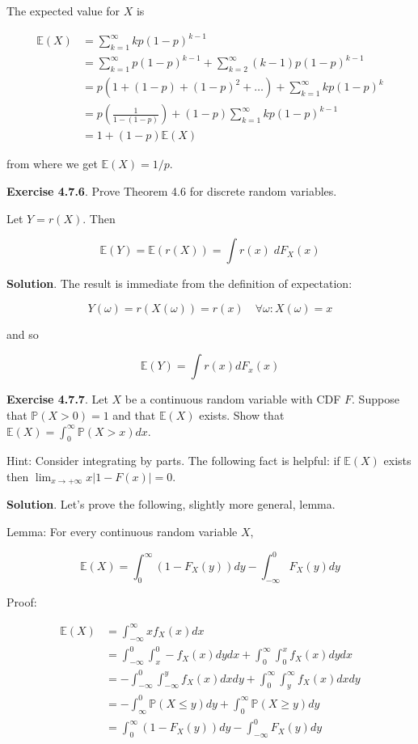 The expected value for \(X\) is

\begin{align}
\mathbb{E}(X) &= \sum_{k=1}^\infty k p (1 - p)^{k - 1}  \\
&= \sum_{k=1}^\infty p(1-p)^{k-1} + \sum_{k=2}^\infty (k - 1) p(1-p)^{k - 1} \\
&= p \left( 1 + (1 - p) + (1 - p)^2 + \dots \right) + \sum_{k=1}^\infty k p(1-p)^k \\
&= p \left(\frac{1}{1 - (1 - p)}\right) + (1 - p) \sum_{k=1}^\infty k p(1-p)^{k - 1} \\
&= 1 + (1 - p) \mathbb{E}(X)
\end{align}

from where we get \(\mathbb{E}(X) = 1 / p\).

\textbf{Exercise 4.7.6}. Prove Theorem 4.6 for discrete random
variables.

Let \(Y = r(X)\). Then

\[ \mathbb{E}(Y) = \mathbb{E}(r(X)) = \int r(x) \; dF_X(x) \]

\textbf{Solution}. The result is immediate from the definition of
expectation:

\[ Y(\omega) = r(X(\omega)) = r(x) \quad \forall \omega : X(\omega) = x \]

and so

\[ \mathbb{E}(Y) = \int r(x) dF_x(x) \]

\textbf{Exercise 4.7.7}. Let \(X\) be a continuous random variable with
CDF \(F\). Suppose that \(\mathbb{P}(X > 0) = 1\) and that
\(\mathbb{E}(X)\) exists. Show that
\(\mathbb{E}(X) = \int_0^\infty \mathbb{P}(X > x) dx\).

Hint: Consider integrating by parts. The following fact is helpful: if
\(\mathbb{E}(X)\) exists then
\(\lim_{x \rightarrow +\infty} x | 1 - F(x) | = 0\).

\textbf{Solution}. Let's prove the following, slightly more general,
lemma.

Lemma: For every continuous random variable \(X\),

\[ \mathbb{E}(X) = \int_0^\infty (1 - F_X(y)) dy - \int_{-\infty}^0 F_X(y) dy \]

Proof:

\begin{align}
\mathbb{E}(X) &= \int_{-\infty}^\infty x f_X(x) dx \\
&= \int_{-\infty}^0 \int_x^0 -f_X(x) dy dx + \int_0^\infty \int_0^x f_X(x) dy dx \\
&= -\int_{-\infty}^0 \int_{-\infty}^y f_X(x) dx dy + \int_0^\infty \int_y^\infty f_X(x) dx dy \\
&= -\int_{\infty}^0 \mathbb{P}(X \leq y) dy + \int_0^\infty \mathbb{P}(X \geq y) dy \\
&= \int_0^\infty (1 - F_X(y)) dy - \int_{-\infty}^0 F_X(y) dy
\end{align}

